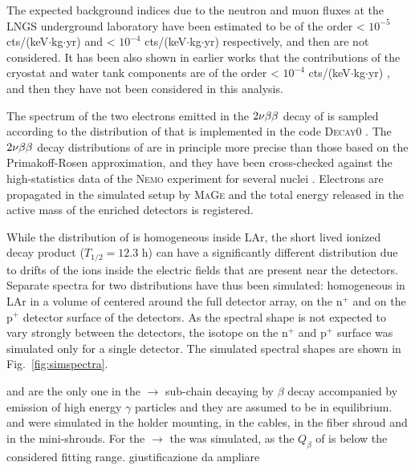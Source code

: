 The expected background indices due to the neutron and muon fluxes at the LNGS underground laboratory have been estimated to be of the order < $10^{-5}$ cts/(keV$\cdot$kg$\cdot$yr) \cite{neutronsBI} and < $10^{-4}$ cts/(keV$\cdot$kg$\cdot$yr) \cite{muonsBI} respectively, and then are not considered. It has been also shown in earlier works that the contributions of the cryostat and water tank components are of the order < $10^{-4}$ cts/(keV$\cdot$kg$\cdot$yr) \cite{criowaterBI}, and then they have not been considered in this analysis.

\marginnote{$2\nbb$} The spectrum of the two electrons emitted in the $2\nbb$ decay of  is sampled according to the distribution of \cite{tables2nbb} that is implemented in the code \textsc{Decay0} \cite{decay0}. The $2\nbb$ decay distributions of \cite{tables2nbb} are in principle more precise than those based on the Primakoff-Rosen approximation, and they have been cross-checked against the high-statistics data of the \textsc{Nemo} experiment for several nuclei \cite{nemo1,nemo2,nemo3,nemo4,nemo5}. Electrons are propagated in the {\gerda} simulated setup by \textsc{MaGe} and the total energy released in the active mass of the enriched detectors is registered.

 While the distribution of  is homogeneous inside LAr, the short lived ionized decay product  ($T_{1/2} = 12.3$ h) can have a significantly different distribution due to drifts of the  ions inside the electric fields that are present near the detectors. Separate spectra for two  distributions have thus been simulated: homogeneous in LAr in a volume of centered around the full detector array, on the n$^+$ and on the p$^+$ detector surface of the detectors. As the spectral shape is not expected to vary strongly between the detectors, the isotope on the n$^+$ and p$^+$ surface was simulated only for a single detector. The simulated spectral shapes are shown in Fig.~\ref{fig:simspectra}.

  and  are the only one in the  $\rightarrow$  sub-chain decaying by $\beta$ decay accompanied by emission of high energy $\gamma$ particles and they are assumed to be in equilibrium.  and  were simulated in the holder mounting, in the cables, in the fiber shroud and in the mini-shrouds. For the  $\rightarrow$  the  was simulated, as the $Q_\beta$ of  is below the considered fitting range. {\color{red}giustificazione da ampliare}

